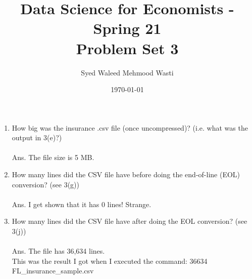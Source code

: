 \documentclass[11pt]{article}
\title{\textbf{Data Science for Economists - Spring 21 \\
\vspace{0.5cm}
Problem Set 3}}
\author{Syed Waleed Mehmood Wasti}
\date{\today}
\begin{document}
\begin{titlepage}
\maketitle
\thispagestyle{empty}
\end{titlepage}





\begin{enumerate}
    \item 
    How big was the insurance .csv file (once uncompressed)? (i.e. what was the output in 3(e)?)\\\\
    Ans. The file size is 5 MB.\\
    
    \item
    How many lines did the CSV file have before doing the end-of-line (EOL) conversion?
    (see 3(g))\\\\
    Ans. I get shown that it has 0 lines! Strange.\\ 
    
    \item
    How many lines did the CSV file have after doing the EOL conversion? (see 3(j))\\\\
    Ans. The file has 36,634 lines. \\

    This was the result I got when I executed the command: 36634 FL\_insurance\_sample.csv     
   
\end{enumerate}
\end{document}

